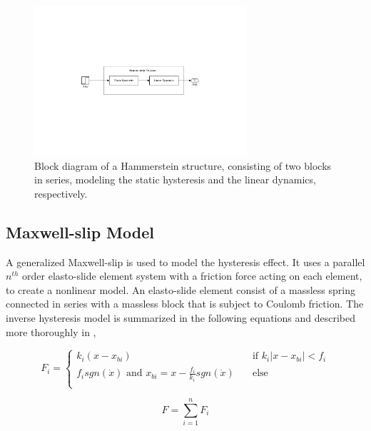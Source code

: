 \begin{figure}[h]
  \centering %
  \includegraphics[width=0.7\textwidth, trim=8cm 8cm 7.73cm 8cm, clip=true]{fig/matlab/hammerstein}
  \caption{\label{fig:hammerstein}Block diagram of a Hammerstein structure, consisting of two blocks in series, modeling the static hysteresis and the linear dynamics, respectively.}
\end{figure}

\subsection{Maxwell-slip Model}
\label{sec:maxwell}
A generalized Maxwell-slip is used to model the hysteresis effect. It uses a parallel $n^{th}$ order elasto-slide element system with a friction force acting on each element, to create a nonlinear model. An elasto-slide element consist of a massless spring connected in series with a massless block that is subject to Coulomb friction. The inverse hysteresis model is summarized in the following equations and described more thoroughly in \citep{Ru:2016},

\begin{equation}
  \label{eq:maxwell_slip}
  F_i =
  \begin{cases}
    k_i(x - x_{bi}) & \quad \text{if }  k_i|x - x_{bi}| < f_i\\
    f_isgn(\dot{x}) \text{ and } x_{bi} = x - \frac{f_i}{k_i}sgn(\dot{x})  & \quad \text{else}\\
  \end{cases}
\end{equation}

\begin{equation}
  \label{eq:maxwell_sum}
  F = \displaystyle\sum_{i=1}^{n} F_i
\end{equation}

